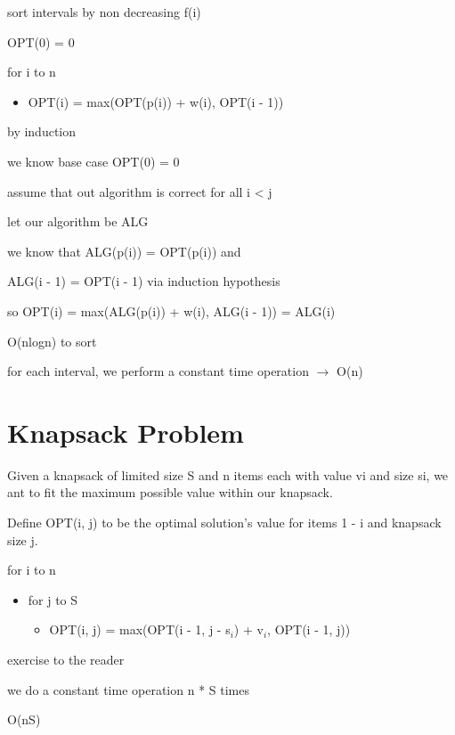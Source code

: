 \algorithm
{
    \item sort intervals by non decreasing f(i)
    \item OPT(0) = 0 
    \item for i to n
    \begin{itemize}
        \item OPT(i) = max(OPT(p(i)) + w(i), OPT(i  - 1))

    \end{itemize}
}
{
    \item by induction
    \item we know base case OPT(0) = 0
    \item assume that out algorithm is correct for all i < j
    \item let our algorithm be ALG
    \item we know that ALG(p(i)) = OPT(p(i)) and \item ALG(i - 1) = OPT(i - 1) via induction hypothesis
    \item so OPT(i) = max(ALG(p(i)) + w(i), ALG(i - 1)) = ALG(i)
    
}
{
    \item O(nlogn) to sort
    \item for each interval, we perform a constant time operation $\rightarrow$ O(n)
}


\section{Knapsack Problem}
Given a knapsack of limited size S and n items each with value vi and size si, we ant to fit the maximum possible value within our knapsack.
 
Define OPT(i, j) to be the optimal solution's value for items 1 - i and knapsack size j.

\algorithm
{
    \item for i to n
    \begin{itemize}
        \item for j to S
        \begin{itemize}
            \item OPT(i, j) = max(OPT(i - 1, j - s$_{i}$) + v$_{i}$, OPT(i - 1, j))
        \end{itemize}
    \end{itemize}
}
{
    \item exercise to the reader
}
{
    \item we do a constant time operation n * S times
    \item O(nS)
}



